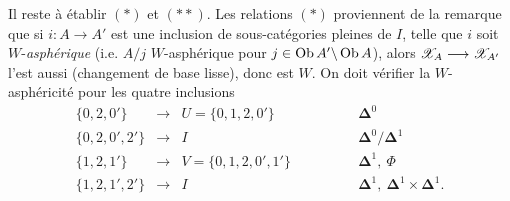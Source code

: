 Il reste à établir $(\ast)$ et $(\ast\ast)$. Les relations $(\ast)$ proviennent de la remarque que si $i : A \longrightarrow A'$ est une inclusion de sous-catégories pleines de $I$, telle que $i$ soit $W$-\textit{asphérique} (i.e. $A/j$ $W$-asphérique pour $j \in \operatorname{Ob} A'\backslash\operatorname{Ob} A$), alors $\mathscr{X}_A \longrightarrow \mathscr{X}_{A'}$ l'est aussi (changement de base lisse), donc est $W$. On doit vérifier la $W$-asphéricité pour les quatre inclusions
\[
\begin{array}{rcll}
\{0,2,0'\} & \longrightarrow & U = \{0,1,2,0'\} & \qquad\qquad \mathbf{\Delta}^0 \\[1ex]
\{0,2,0',2'\} & \longrightarrow & I & \qquad\qquad \mathbf{\Delta}^0/\mathbf{\Delta}^1 \\[1ex]
\{1,2,1'\} & \longrightarrow & V = \{0,1,2,0',1'\} & \qquad\qquad \mathbf{\Delta}^1,\ \Phi \\[1ex]
\{1,2,1',2'\} & \longrightarrow & I & \qquad\qquad \mathbf{\Delta}^1,\ \mathbf{\Delta}^1 \times \mathbf{\Delta}^1.
\end{array}
\]

